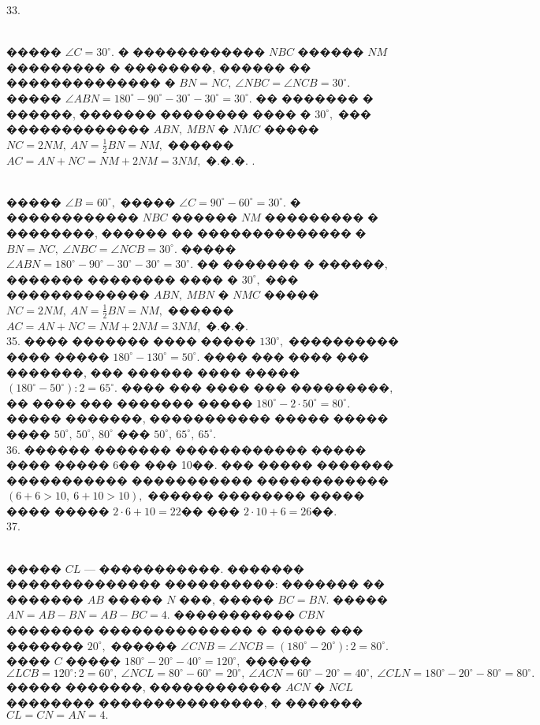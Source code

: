 \documentclass[12pt]{article}
\begin{document}
33. \begin{figure}[ht!]
\end{figure}\\
����� $\angle C=30^\circ.$ � ������������ $NBC$ ������ $NM$ ��������� � ��������, ������ �� �������������� � $BN=NC,\ \angle NBC=\angle NCB=30^\circ.$ ����� $\angle ABN=180^\circ-90^\circ-30^\circ-30^\circ=30^\circ.$ �� ������� � ������, ������� �������� ���� � $30^\circ,$ ��� ������������� $ABN,\ MBN$ � $NMC$ ����� $NC=2NM,\ AN=\frac{1}{2}BN=NM,$ ������ $AC=AN+NC=NM+2NM=3NM,$ �.�.�.\newpage
{}. \begin{figure}[ht!]
\end{figure}\\
����� $\angle B=60^\circ,$ ����� $\angle C=90^\circ-60^\circ=30^\circ.$ � ������������ $NBC$ ������ $NM$ ��������� � ��������, ������ �� �������������� � $BN=NC,\ \angle NBC=\angle NCB=30^\circ.$ ����� $\angle ABN=180^\circ-90^\circ-30^\circ-30^\circ=30^\circ.$ �� ������� � ������, ������� �������� ���� � $30^\circ,$ ��� ������������� $ABN,\ MBN$ � $NMC$ ����� $NC=2NM,\ AN=\frac{1}{2}BN=NM,$ ������ $AC=AN+NC=NM+2NM=3NM,$ �.�.�.\\
35. ���� ������� ���� ����� $130^\circ,$ ���������� ���� ����� $180^\circ-130^\circ=50^\circ.$ ���� ��� ���� ��� �������, ��� ������ ���� ����� $(180^\circ-50^\circ):2=65^\circ.$ ���� ��� ���� ��� ���������, �� ���� ��� ������� ����� $180^\circ-2\cdot50^\circ=80^\circ.$ ����� �������, ����������� ����� ����� ����  $50^\circ,\ 50^\circ,\ 80^\circ$ ��� $50^\circ,\ 65^\circ,\ 65^\circ.$\\
36. ������ ������� ������������ ����� ���� ����� 6�� ��� 10��. ��� ����� ������� ����������� ����������� ������������ $(6+6>10,\ 6+10>10),$ ������ �������� ����� ���� ����� $2\cdot6+10=22$�� ��� $2\cdot10+6=26$��.\\
37. \begin{figure}[ht!]
\end{figure}\\
����� $CL$ --- �����������. ������� �������������� ����������: ������� �� ������� $AB$ ����� $N$ ���, ����� $BC=BN.$ ����� $AN=AB-BN=AB-BC=4.$ ����������� $CBN$ �������� �������������� � ����� ��� ������� $20^\circ,$ ������ $\angle CNB=\angle NCB=(180^\circ-20^\circ):2=80^\circ.$ ���� $C$ ����� $180^\circ-20^\circ-40^\circ=120^\circ,$ ������ $\angle LCB=120^\circ:2=60^\circ,\ \angle NCL=80^\circ-60^\circ=20^\circ,\ \angle ACN=60^\circ-20^\circ=40^\circ,\ \angle CLN=180^\circ-20^\circ-80^\circ=80^\circ.$ ����� �������, ������������ $ACN$ � $NCL$ �������� ���������������, � ������� $CL=CN=AN=4.$\\
\end{document}
